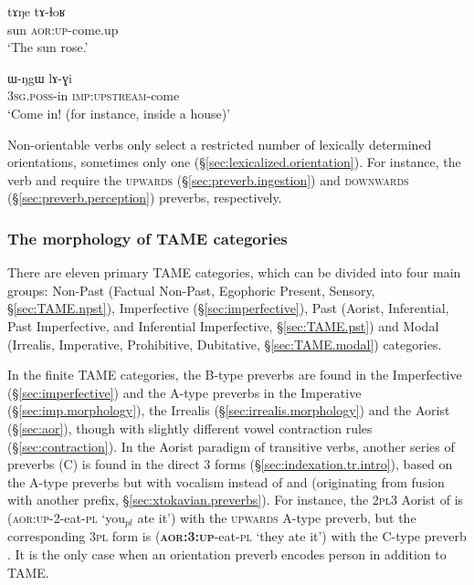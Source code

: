  \begin{exe}
\ex \label{ex:tANe.tAlhoR}
\gll tɤŋe tɤ-ɬoʁ \\
sun \textsc{aor}:\textsc{up}-come.up \\
\glt `The sun rose.' 
\end{exe} 

 \begin{exe}
\ex \label{ex:WNgW.lAGi}
\gll ɯ-ŋgɯ lɤ-ɣi \\
\textsc{3sg}.\textsc{poss}-in \textsc{imp}:\textsc{upstream}-come \\
\glt `Come in! (for instance, inside a house)' 
 \end{exe} 
 
 Non-orientable verbs only select a restricted number of lexically determined orientations, sometimes only one (§\ref{sec:lexicalized.orientation}). For instance, the verb  and   require the \textsc{upwards} (§\ref{sec:preverb.ingestion}) and \textsc{downwards} (§\ref{sec:preverb.perception}) preverbs, respectively.

\subsubsection{The morphology of TAME categories}
There are eleven primary TAME categories, which can be divided into four main groups: Non-Past (Factual Non-Past, Egophoric Present, Sensory, §\ref{sec:TAME.npst}), Imperfective (§\ref{sec:imperfective}), Past (Aorist, Inferential, Past Imperfective, and Inferential Imperfective, §\ref{sec:TAME.pst}) and Modal (Irrealis, Imperative, Prohibitive, Dubitative, §\ref{sec:TAME.modal}) categories. 

In the finite TAME categories, the B-type  preverbs are found in the Imperfective (§\ref{sec:imperfective}) and the A-type preverbs in the Imperative (§\ref{sec:imp.morphology}), the Irrealis (§\ref{sec:irrealis.morphology}) and the Aorist (§\ref{sec:aor}), though with slightly different vowel contraction rules (§\ref{sec:contraction}). In the Aorist paradigm of transitive verbs, another series of preverbs (C) is found in the direct 3\flobv{} forms (§\ref{sec:indexation.tr.intro}), based on the A-type preverbs but with  vocalism instead of  and   (originating from fusion with another prefix, §\ref{sec:xtokavian.preverbs}). For instance, the \textsc{2pl}\fl{}3 Aorist of  is  (\textsc{aor}:\textsc{up}-2-eat-\textsc{pl} `you$_{pl}$ ate it') with the \textsc{upwards} A-type  preverb, but the corresponding \textsc{3pl}\flobv{} form is  (\textbf{\textsc{aor}:3\flobv{}:\textsc{up}}-eat-\textsc{pl} `they ate it') with the C-type preverb . It is the only case when an orientation preverb encodes person in addition to TAME.

